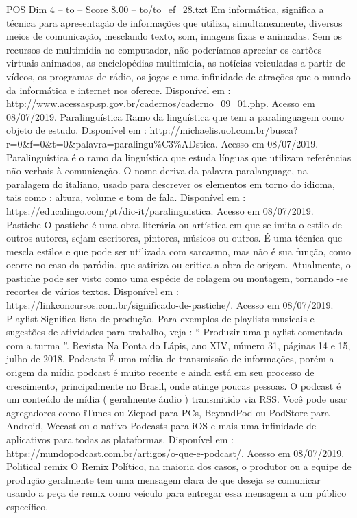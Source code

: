 \begin{textsample}{POS Dim 4 – to – Score 8.00 – to/to\_ef\_28.txt}
Em informática, significa a técnica para apresentação de informações que utiliza, simultaneamente, diversos meios de comunicação, mesclando texto, som, imagens fixas e animadas.
Sem os recursos de multimídia no computador, não poderíamos apreciar os cartões virtuais animados, as enciclopédias multimídia, as notícias veiculadas a partir de vídeos, os programas de rádio, os jogos e uma infinidade de atrações que o mundo da informática e internet nos oferece.
Disponível em : http://www.acessasp.sp.gov.br/cadernos/caderno\_09\_01.php.
Acesso em 08/07/2019.
Paralinguística Ramo da linguística que tem a paralinguagem como objeto de estudo.
Disponível em : http://michaelis.uol.com.br/busca? r=0\&f=0\&t=0\&palavra=paralingu\%C3\%ADstica.
Acesso em 08/07/2019.
Paralinguística é o ramo da linguística que estuda línguas que utilizam referências não verbais à comunicação.
O nome deriva da palavra paralanguage, na paralagem do italiano, usado para descrever os elementos em torno do idioma, tais como : altura, volume e tom de fala.
Disponível em : https://educalingo.com/pt/dic-it/paralinguistica.
Acesso em 08/07/2019.
Pastiche O pastiche é uma obra literária ou artística em que se imita o estilo de outros autores, sejam escritores, pintores, músicos ou outros.
É uma técnica que mescla estilos e que pode ser utilizada com sarcasmo, mas não é sua função, como ocorre no caso da paródia, que satiriza ou critica a obra de origem.
Atualmente, o pastiche pode ser visto como uma espécie de colagem ou montagem, tornando -se recortes de vários textos.
Disponível em : https://linkconcursos.com.br/significado-de-pastiche/.
Acesso em 08/07/2019.
Playlist Significa lista de produção.
Para exemplos de playlists musicais e sugestões de atividades para trabalho, veja : “ Produzir uma playlist comentada com a turma ”.
Revista Na Ponta do Lápis, ano XIV, número 31, páginas 14 e 15, julho de 2018.
Podcasts É uma mídia de transmissão de informações, porém a origem da mídia podcast é muito recente e ainda está em seu processo de crescimento, principalmente no Brasil, onde atinge poucas pessoas.
O podcast é um conteúdo de mídia ( geralmente áudio ) transmitido via RSS.
Você pode usar agregadores como iTunes ou Ziepod para PCs, BeyondPod ou PodStore para Android, Wecast ou o nativo Podcasts para iOS e mais uma infinidade de aplicativos para todas as plataformas.
Disponível em : https://mundopodcast.com.br/artigos/o-que-e-podcast/.
Acesso em 08/07/2019.
Political remix O Remix Político, na maioria dos casos, o produtor ou a equipe de produção geralmente tem uma mensagem clara de que deseja se comunicar usando a peça de remix como veículo para entregar essa mensagem a um público específico.

\end{textsample}

